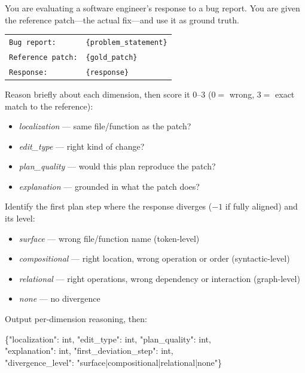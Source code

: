 \documentclass[11pt]{article}
\begin{document}
   \begin{tcolorbox}[enhanced,
    colback=black!3, colframe=black!30, boxrule=0.5pt, arc=2pt,
    left=10pt, right=10pt, top=8pt, bottom=8pt, fontupper=\small,
    title=\textbf{Judge classifier prompt},
    coltitle=black!75, colbacktitle=black!8, fonttitle=\small,
    attach boxed title to top left={xshift=6pt, yshift=-3pt},
    boxed title style={colframe=black!30, arc=1pt}]

  You are evaluating a software engineer's response to a bug report. You are given the
  reference patch---the actual fix---and use it as ground truth.

  \medskip
  \begin{tabular}{@{}ll@{}}
  \texttt{Bug report:}      & \texttt{\{problem\_statement\}} \\
  \texttt{Reference patch:} & \texttt{\{gold\_patch\}} \\
  \texttt{Response:}        & \texttt{\{response\}} \\
  \end{tabular}

  \medskip
  Reason briefly about each dimension, then score it $0$--$3$ ($0=$ wrong, $3=$ exact
  match to the reference):
  \begin{itemize}\setlength\itemsep{1pt}
    \item \emph{localization} --- same file/function as the patch?
    \item \emph{edit\_type} --- right kind of change?
    \item \emph{plan\_quality} --- would this plan reproduce the patch?
    \item \emph{explanation} --- grounded in what the patch does?
  \end{itemize}

  Identify the first plan step where the response diverges ($-1$ if fully aligned) and its level:
  \begin{itemize}\setlength\itemsep{1pt}
    \item \emph{surface} --- wrong file/function name (token-level)
    \item \emph{compositional} --- right location, wrong operation or order (syntactic-level)
    \item \emph{relational} --- right operations, wrong dependency or interaction (graph-level)
    \item \emph{none} --- no divergence
  \end{itemize}

  \tcblower
  Output per-dimension reasoning, then:

  {\ttfamily\small
  \{"localization": int, "edit\_type": int, "plan\_quality": int,\\
  \phantom{\{}"explanation": int, "first\_deviation\_step": int,\\
  \phantom{\{}"divergence\_level": "surface|compositional|relational|none"\}}

  \end{tcolorbox}
\end{document}
